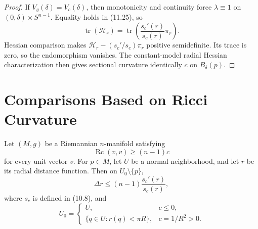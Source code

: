 \begin{theorem}
\begin{proof}
If $V_g(\delta)=V_c(\delta)$, then monotonicity and continuity force
$\lambda\equiv1$ on $(0,\delta)\times S^{n-1}$. Equality holds in (11.25), so
\[
\operatorname{tr}(\mathcal H_r)
=\operatorname{tr}\left(\frac{s_c'(r)}{s_c(r)}\pi_r\right).
\]
Hessian comparison makes
$\mathcal H_r-(s_c'/s_c)\pi_r$ positive semidefinite. Its trace is zero, so
the endomorphism vanishes. The constant-model radial Hessian characterization
then gives sectional curvature identically $c$ on $B_\delta(p)$.
\end{proof}
\end{theorem}
\section{Comparisons Based on Ricci Curvature}

\begin{theorem}
\label{thm:laplacian-comparison-ii}


Let $(M,g)$ be a Riemannian $n$-manifold satisfying
\[
\operatorname{Rc}(v,v)\geq(n-1)c
\]
for every unit vector $v$. For $p\in M$, let $U$ be a normal neighborhood,
and let $r$ be its radial distance function. Then on
$U_0\setminus\{p\}$,
\begin{equation}
\Delta r\leq(n-1)\frac{s_c'(r)}{s_c(r)},
\tag{11.27}
\end{equation}
where $s_c$ is defined in (10.8), and
\[
U_0=
\begin{cases}
U,&c\leq0,\\
\{q\in U:r(q)<\pi R\},&c=1/R^2>0.
\end{cases}
\]
\end{theorem}


